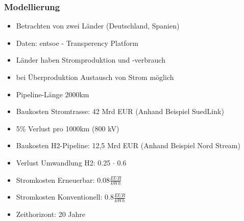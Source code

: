 \documentclass[aspectratio=169,t]{beamer}
\begin{document}
	\begin{frame}
		\frametitle{Modellierung}
		\vspace*{2mm}
		\begin{minipage}{1\linewidth}
			
				\begin{itemize}
					
					\item Betrachten von zwei Länder (Deutschland, Spanien)
					
					\item Daten: entsoe - Transperency Platform
					
					\item Länder haben Stromproduktion und -verbrauch
					
					\item bei Überproduktion Austausch von Strom möglich 
					
					\item Pipeline-Länge 2000km
					
					\item Baukosten Stromtrasse: 42 Mrd EUR (Anhand Beispiel SuedLink)
					
					\item 5\% Verlust pro 1000km (800 kV)
					
					\item Baukosten H2-Pipeline: 12,5 Mrd EUR (Anhand Beispiel Nord Stream)
					
					\item Verlust Umwandlung H2: 0.25 $\cdot$ 0.6
					
					\item Stromkosten Erneuerbar: $ 0.08 \frac{EUR}{kWh}$
					
					\item Stromkosten Konventionell: $ 0.8 \frac{EUR}{kWh}$
					
					\item Zeithorizont: 20 Jahre
					
				\end{itemize}
							
		
		\end{minipage}	
		
	\end{frame}
\end{document}
